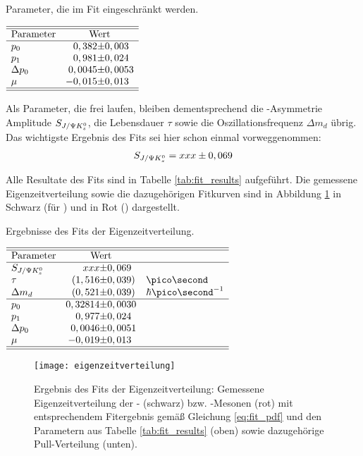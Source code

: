\begin{table}[hptb]
\centering
\caption{Parameter, die im Fit eingeschränkt werden.}
\label{tab:constrained_parameters}
$\begin{array}{l r@{\pm}l }
\hline 
\hline
\text{Parameter} & \multicolumn{2}{c}{\text{Wert}}\\
\hline
p_0 & 0,382 & 0,003 \\
p_1 & 0,981 & 0,024 \\
\Delta p_0 & 0,0045 & 0,0053 \\
\mu & -0,015 & 0,013 \\ \hline \hline
\end{array}$ 
\end{table}

Als Parameter, die frei laufen, bleiben dementsprechend die \CP-Asymmetrie Amplitude $S_{J/\Psi K_s^0}$, die Lebensdauer $\tau$ sowie die Oszillationsfrequenz $\Delta m_d$ übrig. Das wichtigste Ergebnis des Fits sei hier schon einmal vorweggenommen:
\begin{align}
S_{J/\Psi K_s^0} = xxx \pm 0,069     \label{eq:fit_result}
\end{align}

Alle Resultate des Fits sind in Tabelle \ref{tab:fit_results} aufgeführt. Die gemessene Eigenzeitverteilung sowie die dazugehörigen Fitkurven sind in Abbildung \ref{fig:fit_result} in Schwarz (für \Bd) und in Rot (\Bdbar) dargestellt.

\begin{table}[hptb]
\centering
\caption{Ergebnisse des Fits der Eigenzeitverteilung.}
\label{tab:fit_results}
$\begin{array}{l r@{\pm}l l}
\hline 
\hline
\text{Parameter} & \multicolumn{2}{c}{\text{Wert}}\\
\hline
\SJPsi & xxx & 0,069 &\\
\tau & (1,516 & 0,039) & \ps\\
\Delta m_d & (0,521 & 0,039) & \hbar\ps^{-1} \\ \hline
p_0 & 0,32814 & 0,0030 & \\
p_1 & 0,977 & 0,024 &\\
\Delta p_0 & 0,0046 & 0,0051 &\\
\mu & -0,019 & 0,013 &\\ \hline \hline
\end{array}$ 
\end{table}

\begin{figure}[hptb]
\centering
\texttt{[image: eigenzeitverteilung]}
\caption{Ergebnis des Fits der Eigenzeitverteilung: Gemessene Eigenzeitverteilung der \Bd- (schwarz) bzw. \Bdbar-Mesonen (rot) mit entsprechendem Fitergebnis gemäß Gleichung \ref{eq:fit_pdf} und den Parametern aus Tabelle \ref{tab:fit_results} (oben) sowie dazugehörige Pull-Verteilung (unten).}
\label{fig:fit_result}
\end{figure}